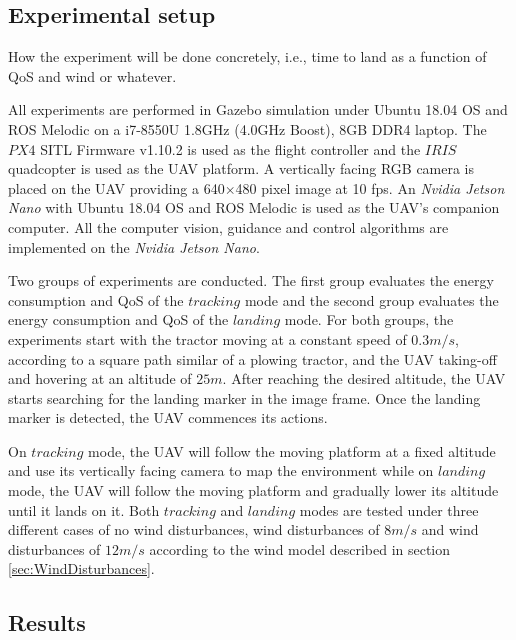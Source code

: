 \documentclass[conference]{IEEEtran}
\begin{document}




\subsection{Experimental setup}

How the experiment will be done concretely, i.e., time to land as a
function of QoS and wind or whatever.

All experiments are performed in Gazebo simulation under Ubuntu 18.04
OS and ROS Melodic on a i7-8550U 1.8GHz (4.0GHz Boost), 8GB DDR4
laptop. The $PX4$ SITL Firmware v1.10.2 is used as the flight
controller and the $IRIS$ quadcopter is used as the UAV platform. A
vertically facing RGB camera is placed on the UAV providing a
640$\times$480 pixel image at 10 fps. An \emph{Nvidia Jetson Nano}
with Ubuntu 18.04 OS and ROS Melodic is used as the UAV's companion
computer. All the computer vision, guidance and control algorithms are
implemented on the \emph{Nvidia Jetson Nano}.

Two groups of experiments are conducted. The first group evaluates the
energy consumption and QoS of the $tracking$ mode and the second group
evaluates the energy consumption and QoS of the $landing$ mode. For
both groups, the experiments start with the tractor moving at a
constant speed of $0.3 m/s$, according to a square path similar of a
plowing tractor, and the UAV taking-off and hovering at an altitude of
$25 m$. After reaching the desired altitude, the UAV starts searching
for the landing marker in the image frame. Once the landing marker is
detected, the UAV commences its actions.


On $tracking$ mode, the UAV will follow the moving platform at a fixed
altitude and use its vertically facing camera to map the environment
while on $landing$ mode, the UAV will follow the moving platform and
gradually lower its altitude until it lands on it. Both $tracking$ and
$landing$ modes are tested under three different cases of no wind
disturbances, wind disturbances of $8 m/s$ and wind disturbances of
$12 m/s$ according to the wind model described in section
\ref{sec:WindDisturbances}.



\subsection{Results}
\end{document}
